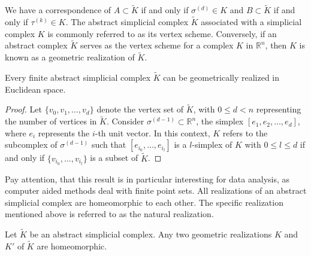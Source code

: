We have a correspondence of $A \subset \tilde{K}$ if and only if $\sigma^{(d)} \in K$ and $B \subset \tilde{K}$ if and only if $\tau^{(k)} \in K$. The abstract simplicial complex $\tilde{K}$ associated with a simplicial complex
$K$ is commonly referred to as its vertex scheme.
Conversely, if an abstract complex $\tilde{K}$ serves as the vertex scheme for a
complex $K$ in $\mathbb{R}^{n}$, then $K$ is known as a geometric realization of $\tilde{K}$.

\begin{proposition}
	Every finite abstract simplicial complex $\tilde{K}$ can be geometrically realized
	in Euclidean space.
\end{proposition}

\begin{proof}
	Let $\{v_{0}, v_{1}, \ldots, v_{d}\}$ denote the vertex set of $\tilde{K}$,
	with $0 \leq d < n$ representing the number of vertices in $\tilde{K}$. Consider $\sigma^{(d-1)}
	\subset \mathbb{R}^{n}$, the simplex
	$[e_{1}, e_{2}, \ldots, e_{d}]$, where $e_{i}$ represents the $i$-th unit vector.
	In this context, $K$ refers to the subcomplex of $\sigma^{(d-1)}$ such that $[e
		_{i_0}, \ldots, e_{i_l}]$ is a $l$-simplex of $K$ with $0 \leq l \leq d$ if and only if $\{v_{i_0}, \ldots
	, v_{i_l}\}$ is a subset of $\tilde{K}$.
\end{proof}

Pay attention, that this result is in particular interesting for data analysis, as computer aided methods deal with finite point sets. All realizations of an abstract simplicial complex are homeomorphic to each other.
The specific realization mentioned above is referred to as the natural
realization.

\begin{proposition}
Let $\tilde{K}$ be an abstract simplicial complex. Any two geometric realizations $K$ and $K'$ of $\tilde{K}$ are homeomorphic.
\end{proposition}

